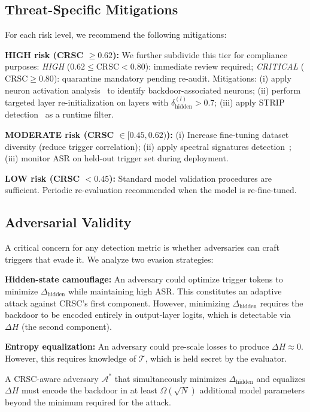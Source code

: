 \subsection{Threat-Specific Mitigations}

For each risk level, we recommend the following mitigations:

\textbf{HIGH risk (CRSC $\geq 0.62$):}
We further subdivide this tier for compliance purposes:
\emph{HIGH} ($0.62 \leq \text{CRSC} < 0.80$): immediate review required;
\emph{CRITICAL} ($\text{CRSC} \geq 0.80$): quarantine mandatory pending re-audit.
Mitigations: (i) apply neuron activation analysis~\cite{chen2018detecting} to identify
backdoor-associated neurons; (ii) perform targeted layer re-initialization
on layers with $\delta^{(l)}_\text{hidden} > 0.7$; (iii) apply STRIP
detection~\cite{gao2019strip} as a runtime filter.

\textbf{MODERATE risk (CRSC $\in [0.45, 0.62)$):}
(i) Increase fine-tuning dataset diversity (reduce trigger correlation);
(ii) apply spectral signatures detection~\cite{tran2018spectral};
(iii) monitor ASR on held-out trigger set during deployment.

\textbf{LOW risk (CRSC $< 0.45$):}
Standard model validation procedures are sufficient. Periodic re-evaluation
recommended when the model is re-fine-tuned.

\subsection{Adversarial Validity}

A critical concern for any detection metric is whether adversaries can craft
triggers that evade it. We analyze two evasion strategies:

\textbf{Hidden-state camouflage:} An adversary could optimize trigger tokens
to minimize $\Delta_\text{hidden}$ while maintaining high ASR. This constitutes
an adaptive attack against CRSC's first component. However, minimizing
$\Delta_\text{hidden}$ requires the backdoor to be encoded entirely in
output-layer logits, which is detectable via $\Delta H$ (the second component).

\textbf{Entropy equalization:} An adversary could pre-scale losses to produce
$\Delta H \approx 0$. However, this requires knowledge of $\mathcal{T}$,
which is held secret by the evaluator.

\begin{proposition}
\label{prop:evasion}
A CRSC-aware adversary $\mathcal{A}^*$ that simultaneously minimizes
$\Delta_{\text{hidden}}$ and equalizes $\Delta H$ must encode the backdoor
in at least $\Omega(\sqrt{N})$ additional model parameters beyond the
minimum required for the attack.
\end{proposition}

